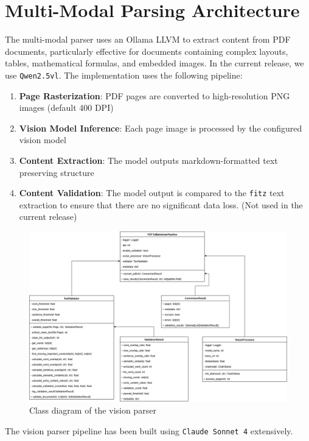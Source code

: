 \documentclass[11pt,a4paper]{report}
\begin{document}
\section{Multi-Modal Parsing Architecture}

The multi-modal parser uses an Ollama LLVM to extract content from PDF documents, particularly effective for documents containing complex layouts, tables, mathematical formulas, and embedded images. In the current release, we use \texttt{Qwen2.5vl}. The implementation uses the following pipeline:

\begin{enumerate}
    \item \textbf{Page Rasterization}: PDF pages are converted to high-resolution PNG images (default 400 DPI)
    \item \textbf{Vision Model Inference}: Each page image is processed by the configured vision model
    \item \textbf{Content Extraction}: The model outputs markdown-formatted text preserving structure
    \item \textbf{Content Validation}: The model output is compared to the \texttt{fitz} text extraction to ensure that there are no significant data loss. (Not used in the current release)
\end{enumerate}

\begin{figure}[H]
    \centering
    \includegraphics[width=\linewidth]{static/schemas/classDiagramOllamaVisionParser.drawio.png}
    \caption{Class diagram of the vision parser}
    \label{fig:VisionParser}
\end{figure}

The vision parser pipeline has been built using \texttt{Claude Sonnet 4} extensively.
\end{document}
